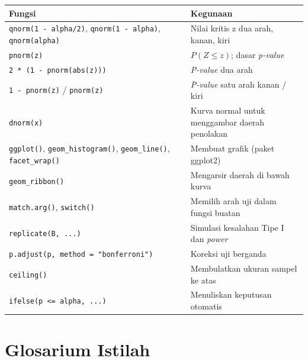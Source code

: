 \documentclass[
  indonesian,
  letterpaper,
]{book}
\newcounter{none} %
\begin{document}
{\def\LTcaptype{none} %
\begin{longtable}[]{@{}
  >{\raggedright\arraybackslash}p{}
  >{\raggedright\arraybackslash}p{}@{}}
\toprule\noalign{}
\begin{minipage}[b]{\linewidth}\raggedright
Fungsi
\end{minipage} & \begin{minipage}[b]{\linewidth}\raggedright
Kegunaan
\end{minipage} \\
\midrule\noalign{}
\endhead
\bottomrule\noalign{}
\endlastfoot
\texttt{qnorm(1\ -\ alpha/2)}, \texttt{qnorm(1\ -\ alpha)},
\texttt{qnorm(alpha)} & Nilai kritis z dua arah, kanan, kiri \\
\texttt{pnorm(z)} & \(P(Z \le z)\); dasar \emph{p-value} \\
\texttt{2\ *\ (1\ -\ pnorm(abs(z)))} & \emph{P-value} dua arah \\
\texttt{1\ -\ pnorm(z)} / \texttt{pnorm(z)} & \emph{P-value} satu arah
kanan / kiri \\
\texttt{dnorm(x)} & Kurva normal untuk menggambar daerah penolakan \\
\texttt{ggplot()}, \texttt{geom\_histogram()}, \texttt{geom\_line()},
\texttt{facet\_wrap()} & Membuat grafik (paket ggplot2) \\
\texttt{geom\_ribbon()} & Mengarsir daerah di bawah kurva \\
\texttt{match.arg()}, \texttt{switch()} & Memilih arah uji dalam fungsi
buatan \\
\texttt{replicate(B,\ ...)} & Simulasi kesalahan Tipe I dan
\emph{power} \\
\texttt{p.adjust(p,\ method\ =\ "bonferroni")} & Koreksi uji berganda \\
\texttt{ceiling()} & Membulatkan ukuran sampel ke atas \\
\texttt{ifelse(p\ \textless{}=\ alpha,\ ...)} & Menuliskan keputusan
otomatis \\
\end{longtable}
}

\section{Glosarium Istilah}\label{glosarium-istilah-1}
\end{document}
